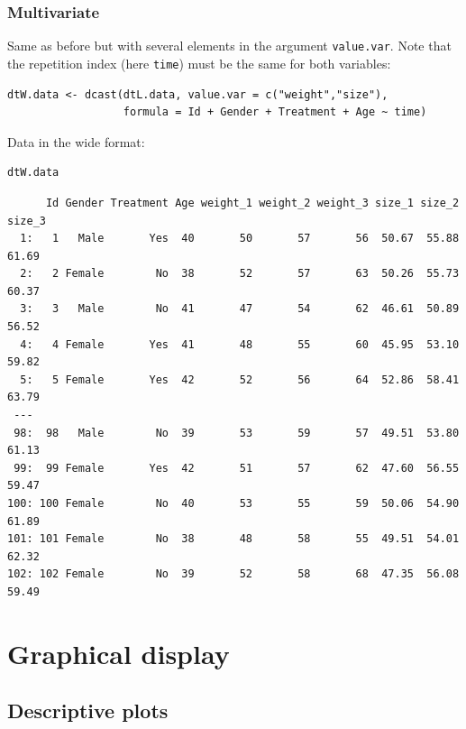 \documentclass{article}
\begin{document}
\clearpage

\subsubsection{Multivariate}
\label{sec:org86237cf}


Same as before but with several elements in the argument
\texttt{value.var}. Note that the repetition index (here \texttt{time}) must be the
same for both variables:
\lstset{language=r,label= ,caption= ,captionpos=b,numbers=none}
\begin{lstlisting}
dtW.data <- dcast(dtL.data, value.var = c("weight","size"),
				  formula = Id + Gender + Treatment + Age ~ time)
\end{lstlisting}

Data in the wide format:
\lstset{language=r,label= ,caption= ,captionpos=b,numbers=none}
\begin{lstlisting}
dtW.data
\end{lstlisting}

\begin{verbatim}
      Id Gender Treatment Age weight_1 weight_2 weight_3 size_1 size_2 size_3
  1:   1   Male       Yes  40       50       57       56  50.67  55.88  61.69
  2:   2 Female        No  38       52       57       63  50.26  55.73  60.37
  3:   3   Male        No  41       47       54       62  46.61  50.89  56.52
  4:   4 Female       Yes  41       48       55       60  45.95  53.10  59.82
  5:   5 Female       Yes  42       52       56       64  52.86  58.41  63.79
 ---                                                                         
 98:  98   Male        No  39       53       59       57  49.51  53.80  61.13
 99:  99 Female       Yes  42       51       57       62  47.60  56.55  59.47
100: 100 Female        No  40       53       55       59  50.06  54.90  61.89
101: 101 Female        No  38       48       58       55  49.51  54.01  62.32
102: 102 Female        No  39       52       58       68  47.35  56.08  59.49
\end{verbatim}

\section{Graphical display}
\label{sec:orgf7d081f}
\subsection{Descriptive plots}
\label{sec:orgff6280c}
\end{document}
